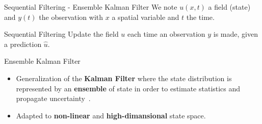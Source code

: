 \documentclass[aspectratio=169]{beamer} %
\begin{document}
\begin{frame}{Sequential Filtering - Ensemble Kalman Filter}
    \small
    We note $u(x, t)$ a field (state) and $y(t)$ the observation with $x$ a spatial variable and $t$ the time.
    \begin{block}{Sequential Filtering}
        Update the field $u$ each time an observation $y$ is made, given a prediction $\hat u$.
    \end{block}
    \vfill
    \begin{block}{Ensemble Kalman Filter}
        \begin{itemize}
            \item Generalization of the \textbf{Kalman Filter} where the state distribution is represented by an \textbf{ensemble} of state in order to estimate statistics and propagate uncertainty~\cite{evensen_sequential_1994}.
            \item Adapted to \textbf{non-linear} and \textbf{high-dimansional} state space.
        \end{itemize}
    \end{block}
\end{frame}
\end{document}

